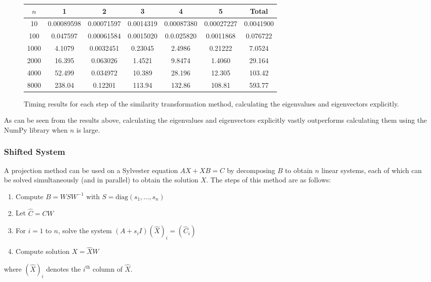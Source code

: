 \documentclass{article}
\numberwithin{equation}{section}
\begin{document}
\begin{figure}[H]
\centering
\begin{tabular}{|c|c|c|c|c|c|c|}
\hline
$n$ & 1 & 2 & 3 & 4 & 5 & Total \\
\hline
10 & 0.00089598 & 0.00071597 & 0.0014319 & 0.00087380 & 0.00027227 & 0.0041900 \\
100 & 0.047597 & 0.00061584 & 0.0015020 & 0.0.025820 & 0.0011868 & 0.076722 \\
1000 & 4.1079 & 0.0032451 & 0.23045 & 2.4986 & 0.21222 & 7.0524 \\
2000 & 16.395 & 0.063026 & 1.4521 & 9.8474 & 1.4060 & 29.164 \\
4000 & 52.499 & 0.034972 & 10.389 & 28.196 & 12.305 & 103.42 \\
8000 & 238.04 & 0.12201 & 113.94 & 132.86 & 108.81 & 593.77 \\
\hline
\end{tabular}
\captionsetup{justification=centering}
\caption{Timing results for each step of the similarity transformation method, calculating the eigenvalues and eigenvectors explicitly.}
\end{figure}

As can be seen from the results above, calculating the eigenvalues and eigenvectors explicitly vastly outperforms calculating them using the NumPy library when $n$ is large.

\subsubsection{Shifted System}
A projection method \cite{Simoncini} can be used on a Sylvester equation $AX + XB =C$ by decomposing $B$ to obtain $n$ linear systems, each of which can be solved simultaneously (and in parallel) to obtain the solution $X$. The steps of this method are as follows:
\begin{enumerate}
\item Compute $B = WSW^{-1}$ with $S = \text{diag}(s_1, \dots, s_n)$
\item Let $\hat{C} = CW$
\item For $i=1$ to $n$, solve the system $(A+s_i I)(\hat{X})_i = (\hat{C}_i)$
\item Compute solution $X = \hat{X}W$
\end{enumerate}
where $(\hat{X})_i$ denotes the $i^{\text{th}}$ column of $\hat{X}$.
\end{document}
